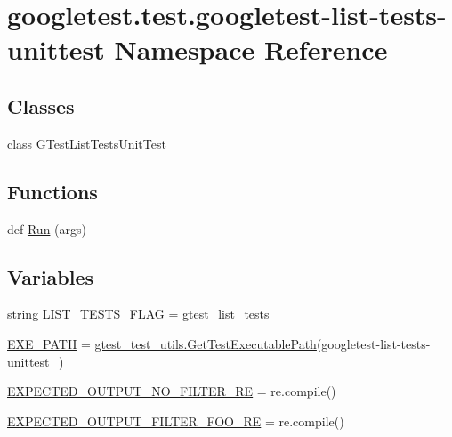 \hypertarget{namespacegoogletest_1_1test_1_1googletest-list-tests-unittest}{}\section{googletest.\+test.\+googletest-\/list-\/tests-\/unittest Namespace Reference}
\label{namespacegoogletest_1_1test_1_1googletest-list-tests-unittest}
\subsection*{Classes}
\begin{DoxyCompactItemize}
\item 
class \mbox{\hyperlink{classgoogletest_1_1test_1_1googletest-list-tests-unittest_1_1_g_test_list_tests_unit_test}{G\+Test\+List\+Tests\+Unit\+Test}}
\end{DoxyCompactItemize}
\subsection*{Functions}
\begin{DoxyCompactItemize}
\item 
def \mbox{\hyperlink{namespacegoogletest_1_1test_1_1googletest-list-tests-unittest_ad23aeb6dad35d4c52695bf4d7c8ae18a}{Run}} (args)
\end{DoxyCompactItemize}
\subsection*{Variables}
\begin{DoxyCompactItemize}
\item 
string \mbox{\hyperlink{namespacegoogletest_1_1test_1_1googletest-list-tests-unittest_ac13f3f3e52740d2ff932a559ea136bfb}{L\+I\+S\+T\+\_\+\+T\+E\+S\+T\+S\+\_\+\+F\+L\+AG}} = \textquotesingle{}gtest\+\_\+list\+\_\+tests\textquotesingle{}
\item 
\mbox{\hyperlink{namespacegoogletest_1_1test_1_1googletest-list-tests-unittest_a9a0acaf8ecd0209c30404d614b02bc3c}{E\+X\+E\+\_\+\+P\+A\+TH}} = \mbox{\hyperlink{namespacegoogletest_1_1test_1_1gtest__test__utils_ac9af888c702350aac56b154a6af34098}{gtest\+\_\+test\+\_\+utils.\+Get\+Test\+Executable\+Path}}(\textquotesingle{}googletest-\/list-\/tests-\/unittest\+\_\+\textquotesingle{})
\item 
\mbox{\hyperlink{namespacegoogletest_1_1test_1_1googletest-list-tests-unittest_a5ef057450e781cb73cf87e99bb406109}{E\+X\+P\+E\+C\+T\+E\+D\+\_\+\+O\+U\+T\+P\+U\+T\+\_\+\+N\+O\+\_\+\+F\+I\+L\+T\+E\+R\+\_\+\+RE}} = re.\+compile()
\item 
\mbox{\hyperlink{namespacegoogletest_1_1test_1_1googletest-list-tests-unittest_aecc28862da1c50189306a3476bff9d6f}{E\+X\+P\+E\+C\+T\+E\+D\+\_\+\+O\+U\+T\+P\+U\+T\+\_\+\+F\+I\+L\+T\+E\+R\+\_\+\+F\+O\+O\+\_\+\+RE}} = re.\+compile()
\end{DoxyCompactItemize}


